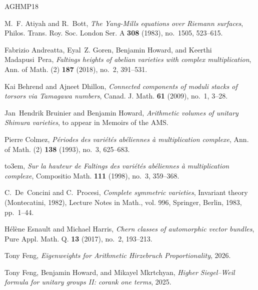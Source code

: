 \documentclass[reqno]{amsart}
\numberwithin{equation}{subsection}
\theoremstyle{definition}
\begin{document}
\providecommand{\bysame}{\leavevmode\hbox to3em{\hrulefill}\thinspace}
\providecommand{\MR}{\relax\ifhmode\unskip\space\fi MR }
\providecommand{\MRhref}[2]{%
  \href{http://www.ams.org/mathscinet-getitem?mr=#1}{#2}
}
\providecommand{\href}[2]{#2}
\begin{thebibliography}{AGHMP18}

M.~F. Atiyah and R.~Bott, \emph{The {Y}ang-{M}ills equations over {R}iemann
  surfaces}, Philos. Trans. Roy. Soc. London Ser. A \textbf{308} (1983),
  no.~1505, 523--615.

Fabrizio Andreatta, Eyal~Z. Goren, Benjamin Howard, and Keerthi Madapusi~Pera,
  \emph{Faltings heights of abelian varieties with complex multiplication},
  Ann. of Math. (2) \textbf{187} (2018), no.~2, 391--531.

Kai Behrend and Ajneet Dhillon, \emph{Connected components of moduli stacks of
  torsors via {T}amagawa numbers}, Canad. J. Math. \textbf{61} (2009), no.~1,
  3--28.

Jan~Hendrik Bruinier and Benjamin Howard, \emph{Arithmetic volumes of unitary
  {S}himura varieties}, to appear in Memoirs of the AMS.

Pierre Colmez, \emph{P\'{e}riodes des vari\'{e}t\'{e}s ab\'{e}liennes \`a
  multiplication complexe}, Ann. of Math. (2) \textbf{138} (1993), no.~3,
  625--683.

\bysame, \emph{Sur la hauteur de {F}altings des vari\'{e}t\'{e}s ab\'{e}liennes
  \`a multiplication complexe}, Compositio Math. \textbf{111} (1998), no.~3,
  359--368.

C.~De~Concini and C.~Procesi, \emph{Complete symmetric varieties}, Invariant
  theory ({M}ontecatini, 1982), Lecture Notes in Math., vol. 996, Springer,
  Berlin, 1983, pp.~1--44.

H\'{e}l\`ene Esnault and Michael Harris, \emph{Chern classes of automorphic
  vector bundles}, Pure Appl. Math. Q. \textbf{13} (2017), no.~2, 193--213.

Tony Feng, \emph{Eigenweights for {A}rithmetic {H}irzebruch {P}roportionality},
  2026.

Tony Feng, Benjamin Howard, and Mikayel Mkrtchyan, \emph{{Higher Siegel--Weil
  formula for unitary groups II: corank one terms}}, 2025.


\end{thebibliography}
\end{document}
